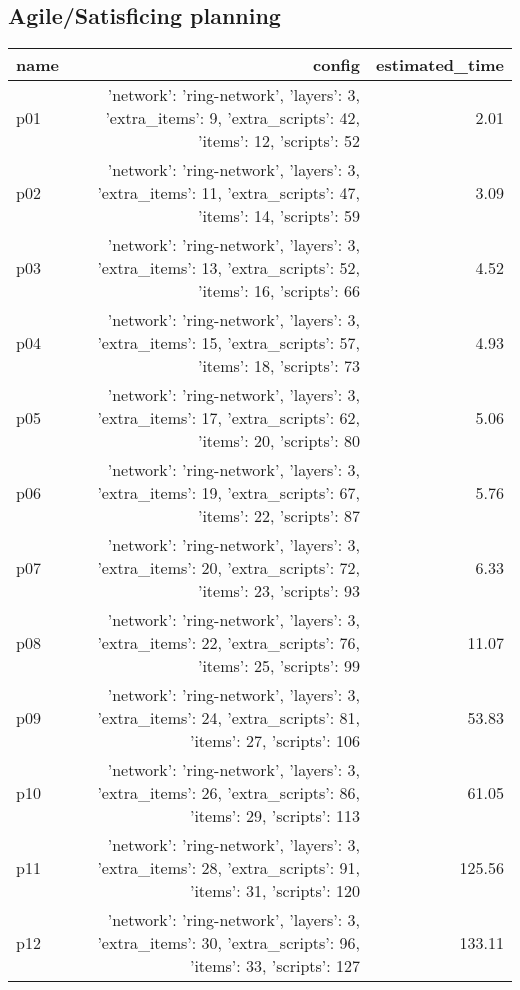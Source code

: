 \documentclass{article}
\begin{document}
                                \subsection*{Agile/Satisficing planning}
                                
                            \begin{center}
                            \scriptsize
                            \begin{tabular}{@{}l|r|r@{}}
                            name & config & estimated\_time\\\midrule
                              p01&{'network': 'ring-network', 'layers': 3, 'extra\_items': 9, 'extra\_scripts': 42, 'items': 12, 'scripts': 52}&2.01\\
  p02&{'network': 'ring-network', 'layers': 3, 'extra\_items': 11, 'extra\_scripts': 47, 'items': 14, 'scripts': 59}&3.09\\
  p03&{'network': 'ring-network', 'layers': 3, 'extra\_items': 13, 'extra\_scripts': 52, 'items': 16, 'scripts': 66}&4.52\\
  p04&{'network': 'ring-network', 'layers': 3, 'extra\_items': 15, 'extra\_scripts': 57, 'items': 18, 'scripts': 73}&4.93\\
  p05&{'network': 'ring-network', 'layers': 3, 'extra\_items': 17, 'extra\_scripts': 62, 'items': 20, 'scripts': 80}&5.06\\
  p06&{'network': 'ring-network', 'layers': 3, 'extra\_items': 19, 'extra\_scripts': 67, 'items': 22, 'scripts': 87}&5.76\\
  p07&{'network': 'ring-network', 'layers': 3, 'extra\_items': 20, 'extra\_scripts': 72, 'items': 23, 'scripts': 93}&6.33\\
  p08&{'network': 'ring-network', 'layers': 3, 'extra\_items': 22, 'extra\_scripts': 76, 'items': 25, 'scripts': 99}&11.07\\
  p09&{'network': 'ring-network', 'layers': 3, 'extra\_items': 24, 'extra\_scripts': 81, 'items': 27, 'scripts': 106}&53.83\\
  p10&{'network': 'ring-network', 'layers': 3, 'extra\_items': 26, 'extra\_scripts': 86, 'items': 29, 'scripts': 113}&61.05\\
  p11&{'network': 'ring-network', 'layers': 3, 'extra\_items': 28, 'extra\_scripts': 91, 'items': 31, 'scripts': 120}&125.56\\
  p12&{'network': 'ring-network', 'layers': 3, 'extra\_items': 30, 'extra\_scripts': 96, 'items': 33, 'scripts': 127}&133.11\\

\end{tabular}
\end{center}
\end{document}

